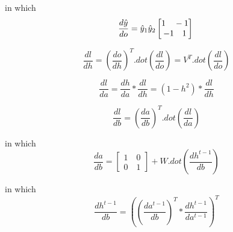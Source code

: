 \documentclass[12pt]{article}
\begin{document}
in which
\begin{equation}
\frac{d \hat y}{do}=\hat y _1 \hat y _2\begin{bmatrix} 1 \quad -1\\
                                                 -1 \quad  1 \end{bmatrix}\\
\end{equation}

\begin{equation}
    \frac{dl}{dh}=(\frac{do}{dh})^T.dot(\frac{dl}{do})=V^T.dot(\frac{dl}{do})
\end{equation}

\begin{equation}
    \frac{dl}{da}=\frac{dh}{da}*\frac{dl}{dh}=(1-h^2)*\frac{dl}{dh}
\end{equation}

\begin{equation}
    \frac{dl}{db}=(\frac{da}{db})^T.dot(\frac{dl}{da})
\end{equation}

in which\\
\begin{equation}
    \frac{da}{db}=\begin{bmatrix} 1 \quad 0 \\ 0 \quad 1
    \end{bmatrix}+W.dot(\frac{dh^{t-1}}{db})
\end{equation}

in which\\
\begin{equation}
    \frac{dh^{t-1}}{db}=((\frac{da^{t-1}}{db})^T*\frac{dh^{t-1}}{da^{t-1}})^T
\end{equation}
\end{document}
